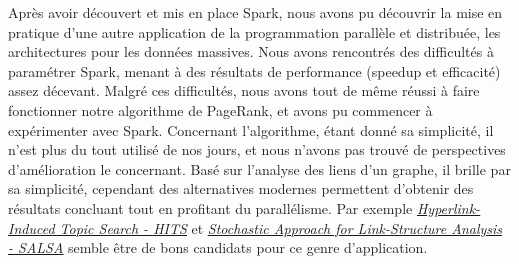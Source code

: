 \documentclass[a4paper, french]{article}
\begin{document}
Après avoir découvert et mis en place Spark, nous avons pu découvrir la mise en pratique d'une autre application de la programmation parallèle et distribuée, les architectures pour les données massives. Nous avons rencontrés des difficultés à paramétrer Spark, menant à des résultats de performance (speedup et efficacité) assez décevant. Malgré ces difficultés, nous avons tout de même réussi à faire fonctionner notre algorithme de PageRank, et avons pu commencer à expérimenter avec Spark. Concernant l'algorithme, étant donné sa simplicité, il n'est plus du tout utilisé de nos jours, et nous n'avons pas trouvé de perspectives d'amélioration le concernant. Basé sur l'analyse des liens d'un graphe, il brille par sa simplicité, cependant des alternatives modernes permettent d'obtenir des résultats concluant tout en profitant du parallélisme. Par exemple \href{https://en.wikipedia.org/wiki/HITS_algorithm}{\textit{\underline{Hyperlink-Induced Topic Search - HITS}}} et \href{https://en.wikipedia.org/wiki/SALSA_algorithm}{\textit{\underline{Stochastic Approach for Link-Structure Analysis - SALSA}}} semble être de bons candidats pour ce genre d'application.
\end{document}
